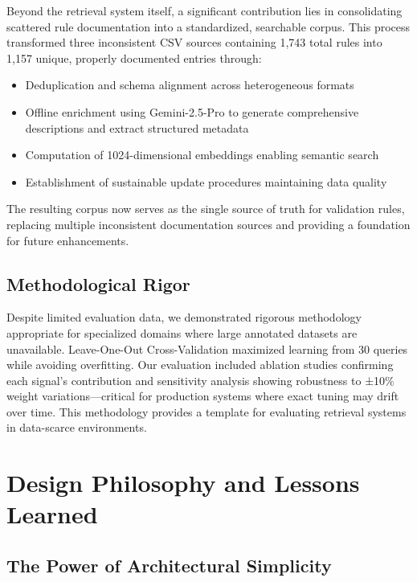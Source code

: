 Beyond the retrieval system itself, a significant contribution lies in consolidating scattered rule documentation into a standardized, searchable corpus. This process transformed three inconsistent CSV sources containing 1,743 total rules into 1,157 unique, properly documented entries through:

\begin{itemize}[leftmargin=*,itemsep=2pt,topsep=2pt]
  \item Deduplication and schema alignment across heterogeneous formats
  \item Offline enrichment using Gemini-2.5-Pro to generate comprehensive descriptions and extract structured metadata
  \item Computation of 1024-dimensional embeddings enabling semantic search
  \item Establishment of sustainable update procedures maintaining data quality
\end{itemize}

The resulting corpus now serves as the single source of truth for validation rules, replacing multiple inconsistent documentation sources and providing a foundation for future enhancements.

\subsection{Methodological Rigor}

Despite limited evaluation data, we demonstrated rigorous methodology appropriate for specialized domains where large annotated datasets are unavailable. Leave-One-Out Cross-Validation maximized learning from 30 queries while avoiding overfitting. Our evaluation included ablation studies confirming each signal's contribution and sensitivity analysis showing robustness to ±10\% weight variations—critical for production systems where exact tuning may drift over time. This methodology provides a template for evaluating retrieval systems in data-scarce environments.

\section{Design Philosophy and Lessons Learned}

\subsection{The Power of Architectural Simplicity}

